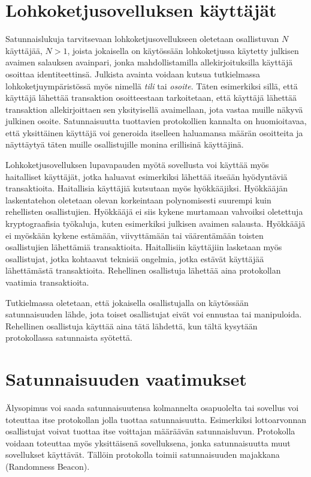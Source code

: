 \section{Lohkoketjusovelluksen käyttäjät}

Satunnaislukuja tarvitsevaan lohkoketjusovellukseen oletetaan osallistuvan $N$ käyttäjää, $N > 1$, joista jokaisella on käytössään lohkoketjussa käytetty julkisen avaimen salauksen avainpari, jonka mahdollistamilla allekirjoituksilla käyttäjä osoittaa identiteettinsä. Julkista avainta voidaan kutsua tutkielmassa lohkoketjuympäristössä myös nimellä \textit{tili} tai \textit{osoite}. Täten esimerkiksi sillä, että käyttäjä lähettää transaktion osoitteestaan tarkoitetaan, että käyttäjä lähettää transaktion allekirjoittaen sen yksityisellä avaimellaan, jota vastaa muille näkyvä julkinen osoite.  Satunnaisuutta tuottavien protokollien kannalta on huomioitavaa, että yksittäinen käyttäjä voi generoida itselleen haluamansa määrän osoitteita ja näyttäytyä täten muille osallistujille monina erillisinä käyttäjinä.

Lohkoketjusovelluksen lupavapauden myötä sovellusta voi käyttää myös haitalliset käyttäjät, jotka haluavat esimerkiksi lähettää itseään hyödyntäviä transaktioita. Haitallisia käyttäjiä kutsutaan myös hyökkääjiksi. Hyökkääjän laskentatehon oletetaan olevan korkeintaan polynomisesti suurempi kuin rehellisten osallistujien. Hyökkääjä ei siis kykene murtamaan vahvoiksi oletettuja kryptograafisia työkaluja, kuten esimerkiksi julkisen avaimen salausta. Hyökkääjä ei myöskään kykene estämään, viivyttämään tai väärentämään toisten osallistujien lähettämiä transaktioita. Haitallisiin käyttäjiin lasketaan myös osallistujat, jotka kohtaavat teknisiä ongelmia, jotka estävät käyttäjää lähettämästä transaktioita. Rehellinen osallistuja lähettää aina protokollan vaatimia transaktioita.

Tutkielmassa oletetaan, että jokaisella osallistujalla on käytössään satunnaisuuden lähde, jota toiset osallistujat eivät voi ennustaa tai manipuloida. Rehellinen osallistuja käyttää aina tätä lähdettä, kun tältä kysytään protokollassa satunnaista syötettä.

\section{Satunnaisuuden vaatimukset}

Älysopimus voi saada satunnaisuutensa kolmannelta osapuolelta tai sovellus voi toteuttaa itse protokollan jolla tuottaa satunnaisuutta. Esimerkiksi lottoarvonnan osallistujat voivat tuottaa itse voittajan määräävän satunnaisluvun. Protokolla voidaan toteuttaa myös yksittäisenä sovelluksena, jonka satunnaisuutta muut sovellukset käyttävät. Tällöin protokolla toimii satunnaisuuden majakkana (Randomness Beacon).

